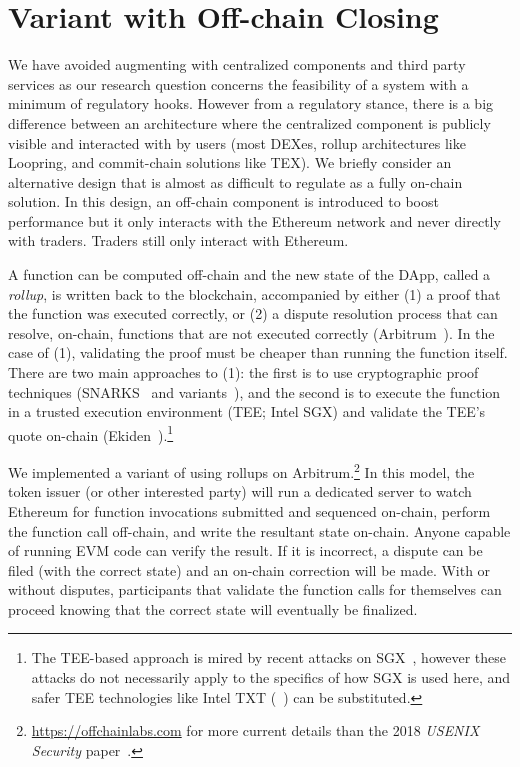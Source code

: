 
\section{\cm Variant with Off-chain Closing}
\label{sec:rollups}

We have avoided augmenting \cm with centralized components and third party services as our research question concerns the feasibility of a system with a minimum of regulatory hooks. However from a regulatory stance, there is a big difference between an architecture where the centralized component is publicly visible and interacted with by users (\eg most DEXes, rollup architectures like Loopring, and commit-chain solutions like TEX). We briefly consider an alternative design that is almost as difficult to regulate as a fully on-chain solution. In this design, an off-chain component is introduced to boost performance but it only interacts with the Ethereum network and never directly with traders. Traders still only interact with Ethereum.

A function can be computed off-chain and the new state of the DApp, called a \textit{rollup}, is written back to the blockchain, accompanied by either (1) a proof that the function was executed correctly, or (2) a dispute resolution process that can resolve, on-chain, functions that are not executed correctly (\eg Arbitrum~\cite{kalodner2018arbitrum}). In the case of (1), validating the proof must be cheaper than running the function itself. There are two main approaches to (1): the first is to use cryptographic proof techniques (\eg SNARKS~\cite{BCGTV13,GGPR13} and variants~\cite{BBHR19}), and the second is to execute the function in a trusted execution environment (TEE; \eg Intel SGX) and validate the TEE's quote on-chain (\eg Ekiden~\cite{cheng2019ekiden}).\footnote{The TEE-based approach is mired by recent attacks on SGX~\cite{SGX1,SGX2,SGX3,SGX4}, however these attacks do not necessarily apply to the specifics of how SGX is used here, and safer TEE technologies like Intel TXT (\cf~\cite{ZBC+19}) can be substituted.}

We implemented a variant of \cm using rollups on Arbitrum.\footnote{\url{https://offchainlabs.com} for more current details than the 2018 \textit{USENIX Security} paper~\cite{kalodner2018arbitrum}.} In this model, the token issuer (or other interested party) will run a dedicated server to watch Ethereum for function invocations submitted and sequenced on-chain, perform the function call off-chain, and write the resultant state on-chain. Anyone capable of running EVM code can verify the result. If it is incorrect, a dispute can be filed (with the correct state) and an on-chain correction will be made. With or without disputes, participants that validate the function calls for themselves can proceed knowing that the correct state will eventually be finalized. 

